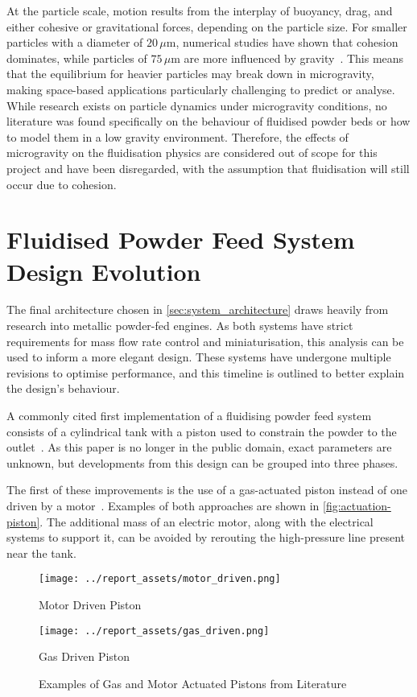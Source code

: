 At the particle scale, motion results from the interplay of buoyancy, drag, and either cohesive or gravitational forces, depending on the particle size. For smaller particles with a diameter of $20\,\mu\mathrm{m}$, numerical studies have shown that cohesion dominates, while particles of $75\,\mu\mathrm{m}$ are more influenced by gravity~\cite{SUN201785}. This means that the equilibrium for heavier particles may break down in microgravity, making space-based applications particularly challenging to predict or analyse. While research exists on particle dynamics under microgravity conditions, no literature was found specifically on the behaviour of fluidised powder beds or how to model them in a low gravity environment. Therefore, the effects of microgravity on the fluidisation physics are considered out of scope for this project and have been disregarded, with the assumption that fluidisation will still occur due to cohesion.


\section{Fluidised Powder Feed System Design Evolution}\label{sec:fluidised-powder-feed-systems}
The final architecture chosen in \autoref{sec:system_architecture} draws heavily from research into metallic powder-fed engines. As both systems have strict requirements for mass flow rate control and miniaturisation, this analysis can be used to inform a more elegant design. These systems have undergone multiple revisions to optimise performance, and this timeline is outlined to better explain the design's behaviour.

A commonly cited first implementation of a fluidising powder feed system consists of a cylindrical tank with a piston used to constrain the powder to the outlet~\cite{LI2021712}. As this paper is no longer in the public domain, exact parameters are unknown, but developments from this design can be grouped into three phases.

The first of these improvements is the use of a gas-actuated piston instead of one driven by a motor~\cite{TANG2023118406}. Examples of both approaches are shown in \autoref{fig:actuation-piston}. The additional mass of an electric motor, along with the electrical systems to support it, can be avoided by rerouting the high-pressure line present near the tank.
\begin{figure}[htbp]
    \centering
    
    \begin{minipage}{0.35\textwidth}
        \centering
        \texttt{[image: ../report\_assets/motor\_driven.png]}
        \caption*{Motor Driven Piston~\cite{SUN201630}}
    \end{minipage}
    \hfill
    \begin{minipage}{0.55\textwidth}
        \centering
        \texttt{[image: ../report\_assets/gas\_driven.png]}
        \caption*{Gas Driven Piston~\cite{Li2016}}
    \end{minipage}
    \caption{Examples of Gas and Motor Actuated Pistons from Literature}\label{fig:actuation-piston}
\end{figure}


